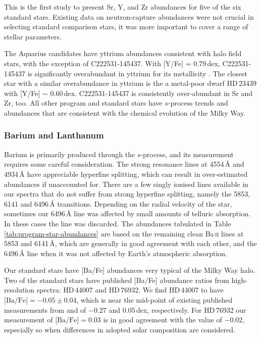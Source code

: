 \documentclass{emulateapj}
\begin{document}
This is the first study to present Sr, Y, and Zr abundances for five of the six standard stars. Existing data on neutron-capture abundances were not crucial in selecting standard comparison stars, it was more important to cover a range of stellar parameters. 

The Aquarius candidates have yttrium abundances consistent with halo field stars, with the exception of {C222531-145437}. With {[Y/Fe] = 0.79}\,dex, {C222531-145437} is significantly overabundant in yttrium for its metallicity \citep[see Figure 4 of][]{travaglio;et-al_2004}. The closest star with a similar overabundance in yttrium is the a metal-poor dwarf HD\,23439 with {[Y/Fe] $\sim{}$ 0.60}\,dex. {C222531-145437} is consistently over-abundant in Sr and Zr, too. All other program and standard stars have $s$-process trends and abundances that are consistent with the chemical evolution of the Milky Way.

\subsubsection{Barium and Lanthanum}
Barium is primarily produced through the $s$-process, and its measurement requires some careful consideration. The strong resonance lines at {4554\,\AA} and {4934\,\AA} have appreciable hyperfine splitting, which can result in over-estimated abundances if unaccounted for. There are a few singly ionised lines available in our spectra that do not suffer from strong hyperfine splitting, namely the 5853, 6141 and {6496\,\AA} transitions. Depending on the radial velocity of the star, sometimes our {6496\,\AA} line was affected by small amounts of telluric absorption. In these cases the line was discarded. The abundances tabulated in Table \ref{tab:program-star-abundances} are based on the remaining clean {Ba\,\textsc{ii}} lines at 5853 and {6141\,\AA}, which are generally in good agreement with each other, and the {6496\,\AA} line when it was not affected by Earth's atmospheric absorption.

Our standard stars have [Ba/Fe] abundances very typical of the Milky Way halo. Two of the standard stars have published [Ba/Fe] abundance ratios from high-resolution spectra: HD\,44007 and HD\,76932. We find HD\,44007 to have ${\mbox{[Ba/Fe]} = -0.05 \pm 0.04}$, which is near the mid-point of existing published measurements from \citet{fulbright_2000} and \citet{burris;et-al_2000} of $-0.27$ and {0.05\,dex}, respectively. For HD\,76932 our measurement of {$\mbox{[Ba/Fe]} = 0.03$} is in good agreement with the \citet{fulbright_2000} value of $-0.02$, especially so when differences in adopted solar composition are considered.
\end{document}
